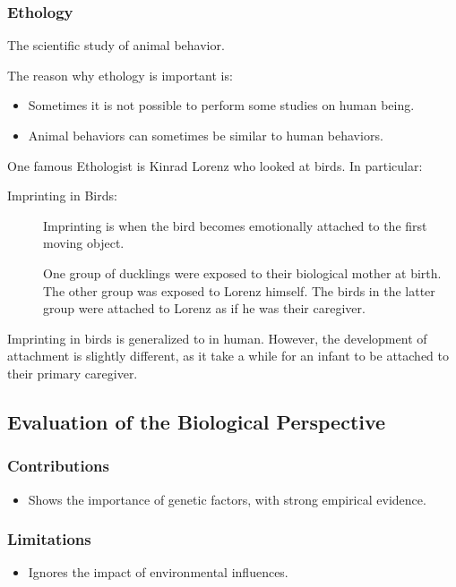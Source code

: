 \documentclass[../main/main.tex]{subfiles}
\begin{document}
\subsubsection{Ethology}
\begin{definition}
The scientific study of animal behavior.
\end{definition}
The reason why ethology is important is:
\begin{itemize}
  \item Sometimes it is not possible to perform some studies on human being.
        \item Animal behaviors can sometimes be similar to human behaviors.
\end{itemize}
One famous Ethologist is Kinrad Lorenz who looked at birds. In particular:
\begin{description}
  \item[Imprinting in Birds:] Imprinting is when the bird becomes emotionally attached to the first moving object.
        \begin{example}
One group of ducklings were exposed to their biological mother at birth. The other group was exposed to Lorenz himself. The birds in the latter group were attached to Lorenz as if he was their caregiver.
        \end{example}
\end{description}

Imprinting in birds is generalized to  in human. However, the development of attachment is slightly different, as it take a while for an infant to be attached to their primary caregiver.

\subsection{Evaluation of the Biological Perspective}
\subsubsection{Contributions}
\begin{itemize}
        \item Shows the importance of genetic factors, with strong empirical evidence.
\end{itemize}
\subsubsection{Limitations}
\begin{itemize}
        \item Ignores the impact of environmental influences.
\end{itemize}
\end{document}
